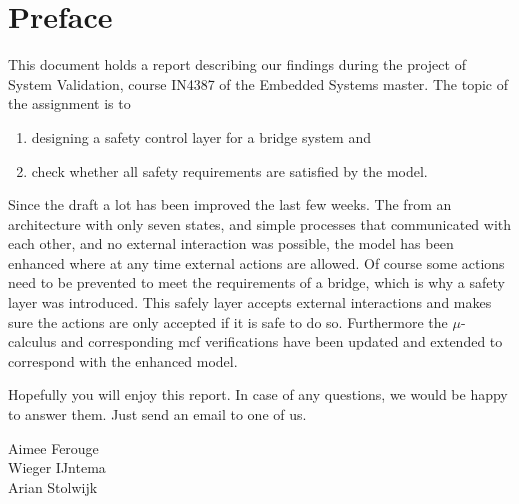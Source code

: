 \newpage
\section*{Preface}

This document holds a report describing our findings during the project of System Validation, course IN4387 of the Embedded Systems master.
The topic of the assignment is to
%
\begin{enumerate}
	\item designing a safety control layer for a bridge system and
	\item check whether all safety requirements are satisfied by the model.
\end{enumerate}
%

Since the draft a lot has been improved the last few weeks. The from an
architecture with only seven states, and simple processes that communicated
with each other, and no external interaction was possible, the model has been
enhanced where at any time external actions are allowed. Of course some actions
need to be prevented to meet the requirements of a bridge, which is why a
safety layer was introduced. This safely layer accepts external interactions
and makes sure the actions are only accepted if it is safe to do so.
Furthermore the $\mu$-calculus and corresponding mcf verifications have been
updated and extended to correspond with the enhanced model.

Hopefully you will enjoy this report. In case of any questions, we would be
happy to answer them. Just send an email to one of us.

\vspace{+50pt}
Aimee Ferouge\\
Wieger IJntema\\
Arian Stolwijk


\newpage
